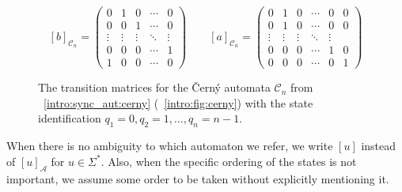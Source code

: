 \begin{figure}[ht]
	\centering
	\[
	[b]_{\mathcal C_n} =
	\left( {\begin{array}{ccccc}
			0 & 1 &  0 & \cdots & 0\\
			0 & 0 &  1 & \cdots & 0\\
			\vdots & \vdots & \vdots & \ddots & \vdots\\
			0 & 0 & 0 & \cdots & 1 \\
			1 & 0 & 0 & \cdots & 0
	\end{array} } \right)
	\qquad 
	[a]_{\mathcal C_n} =
	\left( {\begin{array}{cccccc}
			0 & 1 &  0 & \cdots & 0 & 0 \\
			0 & 1 &  0 & \cdots & 0 & 0 \\
			\vdots & \vdots & \vdots & \ddots & \vdots\\
			0 & 0 & 0 & \cdots & 1 & 0 \\
			0 & 0 & 0 & \cdots & 0 & 1
	\end{array} } \right)
	\]
	\caption[The transition matrices for the \v{C}ern\'y automata $\mathcal C_n$]{
		The transition matrices for the \v{C}ern\'y automata $\mathcal C_n$
		from \SEC~\ref{intro:sync_aut:cerny} (\FIG~\ref{intro:fig:cerny})
		with the state identification $q_1 = 0, q_2 = 1, \ldots, q_n = n - 1$.
	}
	\label{prelim:fig:transitionmtxCerny}
\end{figure} 

When there is no ambiguity to which automaton we refer,
we write $[u]$ instead of $[u]_{\mathcal A}$ for $u \in \Sigma^*$.
Also, when the specific ordering of the states is not important, we
assume some order to be taken without explicitly mentioning it.
